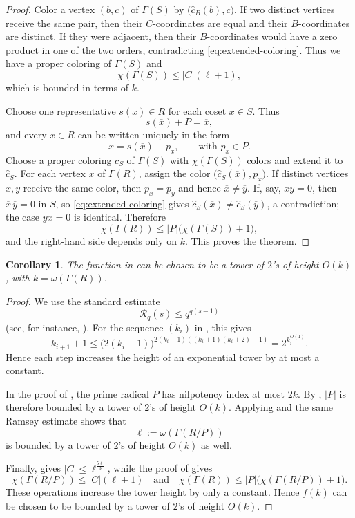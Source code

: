 \documentclass[a4paper,11pt]{amsart}
\newtheorem{cor}[cor]{Corollary}
\theoremstyle{definition}
\begin{document}
\begin{proof}
Color a vertex $(b,c)$ of $\Gamma(S)$ by
$\bigl(\widehat c_B(b),c\bigr)$. If two distinct vertices receive the same
pair, then their $C$-coordinates are equal and their $B$-coordinates are
distinct. If they were adjacent, then their $B$-coordinates would have a
zero product in one of the two orders, contradicting
\eqref{eq:extended-coloring}. Thus we have a proper coloring of $\Gamma(S)$ and
\[
    \chi(\Gamma(S))\le |C|(\ell+1),
\]
which is bounded in terms of $k$.

Choose one representative $s(\overline x)\in R$ for each coset
$\overline x\in S$.  Thus
\[
    s(\overline x)+P=\overline x,
\]
and every $x\in R$ can be written uniquely in the form
\[
    x=s(\overline x)+p_x,
    \qquad\text{with }p_x\in P.
\]
 Choose a proper coloring $c_S$ of
$\Gamma(S)$ with $\chi(\Gamma(S))$ colors and extend it to
$\widehat c_S$. For each vertex $x$ of $\Gamma(R)$, assign the color
$\bigl(\widehat c_S(\overline x),p_x\bigr)$. If distinct vertices $x,y$ receive
the same color, then $p_x=p_y$ and hence $\overline x\ne\overline y$. If, say,
$xy=0$, then $\overline x\,\overline y=0$ in $S$, so \eqref{eq:extended-coloring} gives
$\widehat c_S(\overline x)\ne\widehat c_S(\overline y)$, a contradiction; the case
$yx=0$ is identical. Therefore
\[
    \chi(\Gamma(R))
    \le |P|\bigl(\chi(\Gamma(S))+1\bigr),
\]
and the right-hand side depends only on $k$. This proves the theorem.
\end{proof}


\begin{cor}\label{cor:asymptotic-upper}
The function in  can be chosen to be a tower of $2$'s of height $O(k)$, with $k = \omega(\Gamma(R))$.
\end{cor}
\begin{proof}
We use the standard estimate
\[
    \mathcal R_q(s)\le q^{q(s-1)}
\]
(see, for instance, \cite[Chapter~1]{GRS90}).  For the sequence
$(k_i)$ in , this gives
\[
    k_{i+1}+1
    \le
    \bigl(2(k_i+1)\bigr)^{
        2(k_i+1)((k_i+1)(k_i+2)-1)}
    =
    2^{k_i^{O(1)}}.
\]
Hence each step increases the height of an exponential tower by at most
a constant.

In the proof of , the prime radical $P$ has
nilpotency index at most $2k$.  By , $|P|$ is
therefore bounded by a tower of $2$'s of height $O(k)$.  Applying
 and the same Ramsey estimate shows that
\[
    \ell:=\omega(\Gamma(R/P))
\]
is bounded by a tower of $2$'s of height $O(k)$ as well.

Finally,  gives
$|C|\le\ell^{\frac{5\ell}{3}}$, while the proof of
 gives
\[
    \chi(\Gamma(R/P))\le |C|(\ell+1)
    \quad\text{and}\quad
    \chi(\Gamma(R))
    \le |P|\bigl(\chi(\Gamma(R/P))+1\bigr).
\]
These operations increase the tower height by only a constant.  Hence
$f(k)$ can be chosen to be bounded by a tower of $2$'s of height $O(k)$.
\end{proof}
\end{document}
